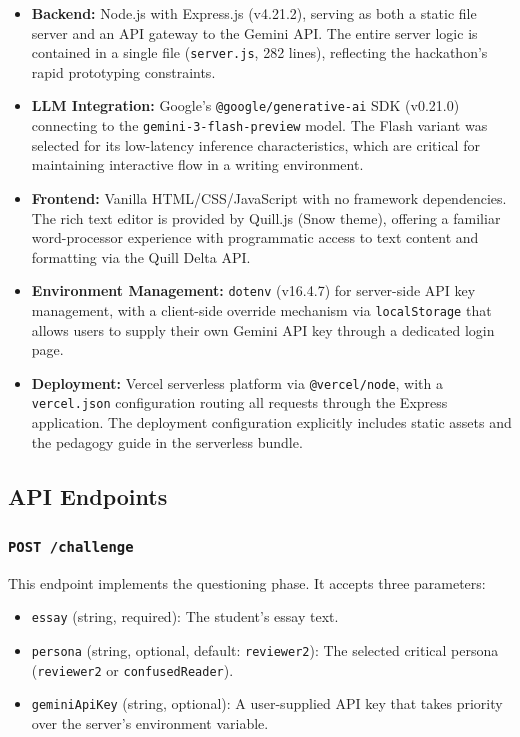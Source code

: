 \documentclass[11pt,a4paper]{article}
\begin{document}
\begin{itemize}[leftmargin=*]
    \item \textbf{Backend:} Node.js with Express.js (v4.21.2), serving as both a static file server and an API gateway to the Gemini API. The entire server logic is contained in a single file (\texttt{server.js}, 282 lines), reflecting the hackathon's rapid prototyping constraints.

    \item \textbf{LLM Integration:} Google's \texttt{@google/generative-ai} SDK (v0.21.0) connecting to the \texttt{gemini-3-flash-preview} model. The Flash variant was selected for its low-latency inference characteristics, which are critical for maintaining interactive flow in a writing environment.

    \item \textbf{Frontend:} Vanilla HTML/CSS/JavaScript with no framework dependencies. The rich text editor is provided by Quill.js (Snow theme), offering a familiar word-processor experience with programmatic access to text content and formatting via the Quill Delta API.

    \item \textbf{Environment Management:} \texttt{dotenv} (v16.4.7) for server-side API key management, with a client-side override mechanism via \texttt{localStorage} that allows users to supply their own Gemini API key through a dedicated login page.

    \item \textbf{Deployment:} Vercel serverless platform via \texttt{@vercel/node}, with a \texttt{vercel.json} configuration routing all requests through the Express application. The deployment configuration explicitly includes static assets and the pedagogy guide in the serverless bundle.
\end{itemize}

\subsection{API Endpoints}

\subsubsection{\texttt{POST /challenge}}

This endpoint implements the questioning phase. It accepts three parameters:

\begin{itemize}[leftmargin=*]
    \item \texttt{essay} (string, required): The student's essay text.
    \item \texttt{persona} (string, optional, default: \texttt{reviewer2}): The selected critical persona (\texttt{reviewer2} or \texttt{confusedReader}).
    \item \texttt{geminiApiKey} (string, optional): A user-supplied API key that takes priority over the server's environment variable.
\end{itemize}
\end{document}
